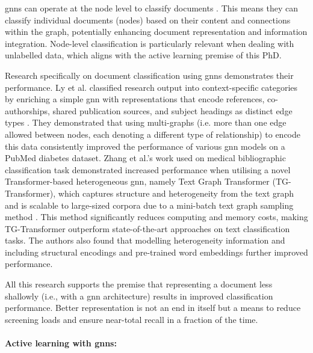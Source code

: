 \documentclass[10pt,oneside]{book}
\begin{document}
\gls*{gnn}s can operate at the node level to classify documents \cite{kipf_semi-supervised_2017, yao_graph_2018, wang_graph_2024, rong_dropedge_2020}. This means they can classify individual documents (nodes) based on their content and connections within the graph, potentially enhancing document representation and information integration. Node-level classification is particularly relevant when dealing with unlabelled data, which aligns with the active learning premise of this PhD.

Research specifically on document classification using \gls*{gnn}s demonstrates their performance. Ly et al. classified research output into context-specific categories by enriching a simple \gls*{gnn} with representations that encode references, co-authorships, shared publication sources, and subject headings as distinct edge types \cite{ly_article_2024}. They demonstrated that using multi-graphs (i.e. more than one edge allowed between nodes, each denoting a different type of relationship) to encode this data consistently improved the performance of various \gls*{gnn} models on a PubMed diabetes dataset. Zhang et al.'s work used on medical bibliographic classification task demonstrated increased performance when utilising a novel Transformer-based heterogeneous \gls*{gnn}, namely Text Graph Transformer (TG-Transformer), which captures structure and heterogeneity from the text graph and is scalable to large-sized corpora due to a mini-batch text graph sampling method \cite{zhang_evaluating_2020}. This method significantly reduces computing and memory costs, making TG-Transformer outperform state-of-the-art approaches on text classification tasks. The authors also found that modelling heterogeneity information and including structural encodings and pre-trained word embeddings further improved performance.

All this research supports the premise that representing a document less shallowly (i.e., with a \gls*{gnn} architecture) results in improved classification performance. Better representation is not an end in itself but a means to reduce screening loads and ensure near-total recall in a fraction of the time.

\paragraph{Active learning with \gls*{gnn}s: }
\end{document}
